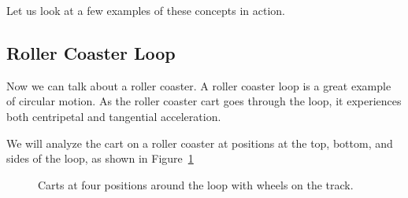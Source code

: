 Let us look at a few examples of these concepts in action.
\subsection{Roller Coaster Loop}
Now we can talk about a roller coaster. A roller coaster loop is a great example of circular motion. As the roller coaster cart goes through the loop, it experiences both centripetal and tangential acceleration.

We will analyze the cart on a roller coaster at positions at the top, bottom, and sides of the loop, as shown in Figure~\ref{fig:roller_allfour}

\begin{figure}[H]
  \centering
  \caption{Carts at four positions around the loop with wheels on the track.}
  \label{fig:roller_allfour}

\end{figure}

